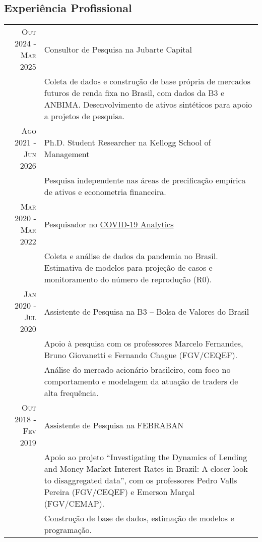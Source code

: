 \documentclass[a4paper,10pt]{article}
\begin{document}
\begin{samepage}
\section{Experiência Profissional}
\begin{tabular}{r|p{10.75cm}}
    \textsc{Out 2024 - Mar 2025} & Consultor de Pesquisa na Jubarte Capital \\
    & \footnotesize{Coleta de dados e construção de base própria de mercados futuros de renda fixa no Brasil, com dados da B3 e ANBIMA. Desenvolvimento de ativos sintéticos para apoio a projetos de pesquisa.} \\
    \textsc{Ago 2021 - Jun 2026} & Ph.D. Student Researcher na Kellogg School of Management \\
    & \footnotesize{Pesquisa independente nas áreas de precificação empírica de ativos e econometria financeira.} \\
    \textsc{Mar 2020 - Mar 2022} & Pesquisador no \href{https://covid19analytics.com.br/}{COVID-19 Analytics} \\
    & \footnotesize{Coleta e análise de dados da pandemia no Brasil. Estimativa de modelos para projeção de casos e monitoramento do número de reprodução (R0).} \\
    \textsc{Jan 2020 - Jul 2020} & Assistente de Pesquisa na B3 – Bolsa de Valores do Brasil \\
    & \footnotesize{Apoio à pesquisa com os professores Marcelo Fernandes, Bruno Giovanetti e Fernando Chague (FGV/CEQEF).} \\
    & \footnotesize{Análise do mercado acionário brasileiro, com foco no comportamento e modelagem da atuação de traders de alta frequência.} \\
    \textsc{Out 2018 - Fev 2019} & Assistente de Pesquisa na FEBRABAN \\
    & \footnotesize{Apoio ao projeto ``Investigating the Dynamics of Lending and Money Market Interest Rates in Brazil: A closer look to disaggregated data”, com os professores Pedro Valls Pereira (FGV/CEQEF) e Emerson Marçal (FGV/CEMAP).} \\
    & \footnotesize{Construção de base de dados, estimação de modelos e programação.}
\end{tabular}
\end{samepage}
\end{document}

